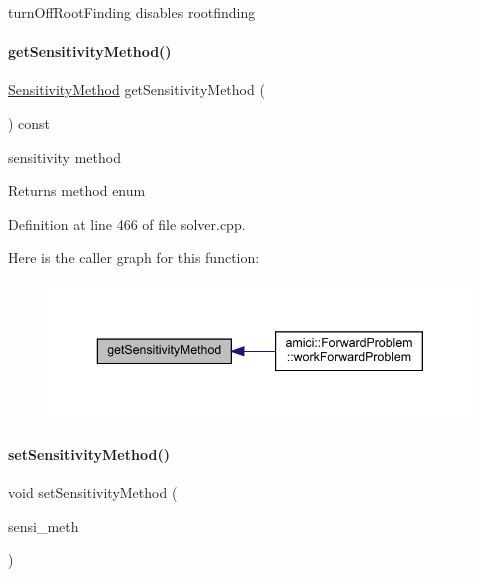 turn\+Off\+Root\+Finding disables rootfinding \mbox{\label{classamici_1_1_solver_a888cb7142e103c84bdeeb99566aba65a}} 
\paragraph{\texorpdfstring{get\+Sensitivity\+Method()}{getSensitivityMethod()}}
{\footnotesize\ttfamily \mbox{\hyperlink{namespaceamici_aa0fa493529f6872e7e776b91fbbf38f9}{Sensitivity\+Method}} get\+Sensitivity\+Method (\begin{DoxyParamCaption}{ }\end{DoxyParamCaption}) const}

sensitivity method \begin{DoxyReturn}{Returns}
method enum 
\end{DoxyReturn}


Definition at line 466 of file solver.\+cpp.

Here is the caller graph for this function\+:
\nopagebreak
\begin{figure}[H]
\begin{center}
\leavevmode
\includegraphics[width=343pt]{classamici_1_1_solver_a888cb7142e103c84bdeeb99566aba65a_icgraph}
\end{center}
\end{figure}
\mbox{\label{classamici_1_1_solver_a3a7713f2ce77ffade77445a825ad289d}} 
\paragraph{\texorpdfstring{set\+Sensitivity\+Method()}{setSensitivityMethod()}}
{\footnotesize\ttfamily void set\+Sensitivity\+Method (\begin{DoxyParamCaption}\item[{\mbox{\hyperlink{namespaceamici_aa0fa493529f6872e7e776b91fbbf38f9}{Sensitivity\+Method}}}]{sensi\+\_\+meth }\end{DoxyParamCaption})}


